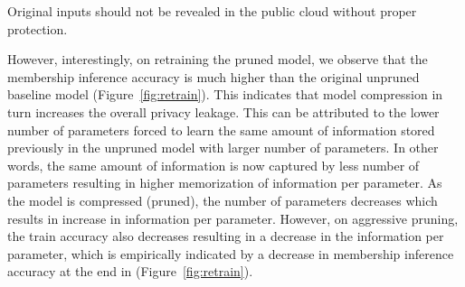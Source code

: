 \begin{tcolorbox}[enhanced,attach boxed title to top center={yshift=-3mm,yshifttext=-1mm},
  colback=gray!5!white,colframe=black!75!black,colbacktitle=gray!80!black,
  title=Security Principle I,fonttitle=\bfseries,
  boxed title style={size=small,colframe=black!50!black} ]
Original inputs should not be revealed in the public cloud without proper protection.
\end{tcolorbox}

However, interestingly, on retraining the pruned model, we observe that the membership inference accuracy is much higher than the original unpruned baseline model (Figure~\ref{fig:retrain}).
This indicates that model compression in turn increases the overall privacy leakage.
This can be attributed to the lower number of parameters forced to learn the same amount of information stored previously in the unpruned model with larger number of parameters.
In other words, the same amount of information is now captured by less number of parameters resulting in higher memorization of information per parameter.
As the model is compressed (pruned), the number of parameters decreases which results in increase in information per parameter. However, on aggressive pruning, the train accuracy also decreases resulting in a decrease in the information per parameter, which is empirically indicated by a decrease in membership inference accuracy at the end in (Figure~\ref{fig:retrain}).




